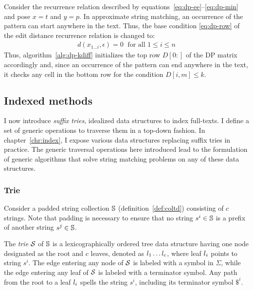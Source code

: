 Consider the recurrence relation described by equations~\ref{eq:dp-ee}--\ref{eq:dp-min} and pose $x=t$ and $y=p$.
In approximate string matching, an occurrence of the pattern can start anywhere in the text.
Thus, the base condition \ref{eq:dp-row} of the edit distance recurrence relation is changed to:
\begin{eqnarray}
d(x_{1 \dots i}, \epsilon) = 0 \; \text{ for all } 1 \leq i \leq n\label{eq:dp-row-kdiff}
\end{eqnarray}
Thus, algorithm~\ref{alg:dp-kdiff} initializes the top row $D[0:]$ of the DP matrix accordingly
and, since an occurrence of the pattern can end anywhere in the text, it checks any cell in the bottom row for the condition $D[i,m] \leq k$.

%


\subsection{Indexed methods}
\label{sub:introindex}

I now introduce \emph{suffix tries}, idealized data structures to index full-texts.
I define a set of generic operations to traverse them in a top-down fashion.
In chapter~\ref{chr:index}, I expose various data structures replacing suffix tries in practice.
The generic traversal operations here introduced lead to the formulation of generic algorithms that solve string matching problems on any of these data structures.

\subsubsection{Trie}

Consider a padded string collection $\mathbb {S}$ (definition~\ref{def:coltd}) consisting of $c$ strings.
Note that padding is necessary to ensure that no string $s^i \in \mathbb {S}$ is a prefix of another string $s^j \in \mathbb {S}$.
\begin{definition}
The \emph{trie} $\mathcal {S}$ of $\mathbb {S}$ is a lexicographically ordered tree data structure having one node designated as the root and $c$ leaves, denoted as $l_1 \dots l_c$, where leaf $l_i$ points to string $s^i$.
The edge entering any node of $\mathcal {S}$ is labeled with a symbol in $\Sigma$, while the edge entering any leaf of $\mathcal {S}$ is labeled with a terminator symbol.
Any path from the root to a leaf $l_i$ spells the string $s^i$, including its terminator symbol $\$^i$.
\end{definition}

